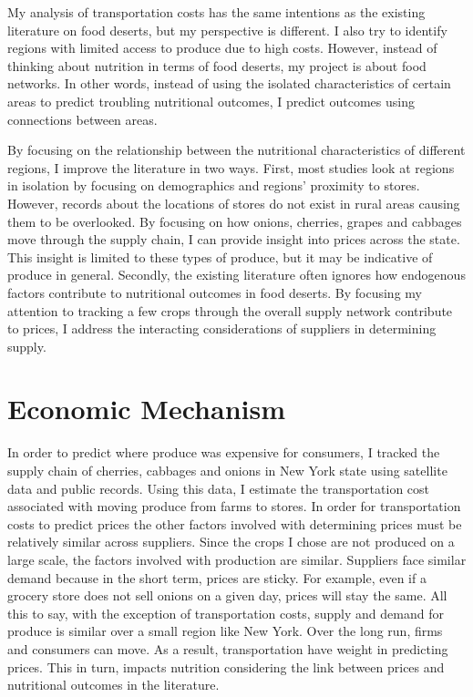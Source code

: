 \documentclass{report}
\begin{document}
My analysis of transportation costs has the same intentions as the existing literature on food deserts, but my perspective is different. I also try to identify regions with limited access to produce due to high costs. However, instead of thinking about nutrition in terms of food deserts, my project is about food networks. In other words, instead of using the isolated characteristics of certain areas to predict troubling nutritional outcomes, I predict outcomes using connections between areas. 

By focusing on the relationship between the nutritional characteristics of different regions, I improve the literature in two ways. First, most studies look at regions in isolation by focusing on demographics and regions' proximity to stores. However, records about the locations of stores do not exist in rural areas causing them to be overlooked. By focusing on how onions, cherries, grapes and cabbages move through the supply chain, I can provide insight into prices across the state. This insight is limited to these types of produce, but it may be indicative of produce in general. Secondly, the existing literature often ignores how endogenous factors contribute to nutritional outcomes in food deserts. By focusing my attention to tracking a few crops through the overall supply network contribute to prices, I address the interacting considerations of suppliers in determining supply.

\section{Economic Mechanism}

In order to predict where produce was expensive for consumers, I tracked the supply chain of cherries, cabbages and onions in New York state using satellite data and public records. Using this data, I estimate the transportation cost associated with moving produce from farms to stores. In order for transportation costs to predict prices the other factors involved with determining prices must be relatively similar across suppliers. Since the crops I chose are not produced on a large scale, the factors involved with production are similar. Suppliers face similar demand because in the short term, prices are sticky. For example, even if a grocery store does not sell onions on a given day, prices will stay the same. All this to say, with the exception of transportation costs, supply and demand for produce is similar over a small region like New York. Over the long run, firms and consumers can move. As a result, transportation have weight in predicting prices. This in turn, impacts nutrition considering the link between prices and nutritional outcomes in the literature. 
\end{document}
